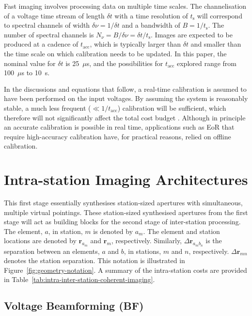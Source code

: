 \documentclass[
  journal=pasa,
  manuscript=article-type,
  year=2020,
  volume=37,
]{cup-journal}
\begin{document}
Fast imaging involves processing data on multiple time scales. The channelisation of a voltage time stream of length $\delta t$ with a time resolution of $t_\textrm{s}$ will correspond to spectral channels of width $\delta\nu=1/\delta t$ and a bandwidth of $B=1/t_\textrm{s}$. The number of spectral channels is $N_\nu=B/\delta\nu=\delta t/t_\textrm{s}$. Images are expected to be produced at a cadence of $t_\textrm{acc}$, which is typically larger than $\delta t$ and smaller than the time scale on which calibration needs to be updated. In this paper, the nominal value for $\delta t$ is 25~$\mu$s, and the possibilities for $t_\textrm{acc}$ explored range from 100~$\mu$s to 10~s. 

In the discussions and equations that follow, a real-time calibration is assumed to have been performed on the input voltages. By assuming the system is reasonably stable, a much less frequent ($\ll 1/t_\textrm{acc}$) calibration will be sufficient, which therefore will not significantly affect the total cost budget \citep{Beardsley+2017,Gorthi+2021}. Although in principle an accurate calibration is possible in real time, applications such as EoR that require high-accuracy calibration have, for practical reasons, relied on offline calibration.

\section{Intra-station Imaging Architectures} \label{sec:intra-station-arch}

This first stage essentially synthesises station-sized apertures with simultaneous, multiple virtual pointings. These station-sized synthesised apertures from the first stage will act as building blocks for the second stage of inter-station processing. The element, $a$, in station, $m$ is denoted by $a_m$. The element and station locations are denoted by $\boldsymbol{r}_{a_m}$ and $\boldsymbol{r}_m$, respectively. Similarly, $\Delta\boldsymbol{r}_{a_m b_n}$ is the separation between an elements, $a$ and $b$, in stations, $m$ and $n$, respectively. $\Delta\boldsymbol{r}_{mn}$ denotes the station separation. This notation is illustrated in Figure~\ref{fig:geometry-notation}. A summary of the intra-station costs are provided in Table~\ref{tab:intra-inter-station-coherent-imaging}. 

\subsection{Voltage Beamforming (BF)}
\end{document}
